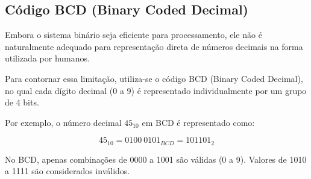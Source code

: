 \subsection{Código BCD (Binary Coded Decimal)}
\label{sec:bcd}

Embora o sistema binário seja eficiente para processamento, ele não é naturalmente adequado para representação direta de números decimais na forma utilizada por humanos.

Para contornar essa limitação, utiliza-se o código BCD (Binary Coded Decimal), no qual cada dígito decimal (0 a 9) é representado individualmente por um grupo de 4 bits.

Por exemplo, o número decimal $45_{10}$ em BCD é representado como:

\[
45_{10} = 0100\ 0101_{BCD} =  101101_2
\]

No BCD, apenas combinações de 0000 a 1001 são válidas (0 a 9). Valores de 1010 a 1111 são considerados inválidos.